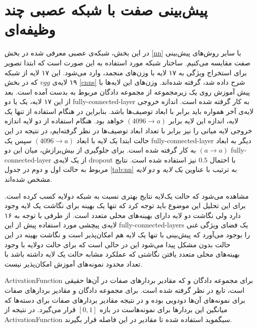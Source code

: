 \section{پیش‌بینی صفت با شبکه عصبی چند وظیفه‌ای} \label{exp:nn}

در این بخش، شبکه‌ی عصبی معرفی شده در بخش \ref{nn} با سایر روش‌های پیش‌بینی صفت مقایسه می‌کنیم.
ساختار شبکه مورد استفاده به این صورت است که ابتدا تصویر برای استخراج ویژگی به ۱۷ لایه با وزن‌های منجمد، وارد می‌شود. این ۱۷ لایه از شبکه ۱۹ لایه‌ی $vgg$ که در بخش
\ref{cnns}
شرح داده شد، گرفته شده‌اند. وزن‌های این لایه‌ها با پیش آموزش روی یک زیرمجموعه از مجموعه دادگان  مربوط به  بدست آمده است.
بعد از این ۱۷ لایه، یک یا دو \gls{fully-connected-layer} به کار گرفته شده است. اندازه خروجی لایه‌ی آخر همواره باید برابر با ابعاد توصیف‌ها باشد. بنابراین در هنگام استفاده از تنها یک لایه، اندازه این لایه برابر
$(4096 \rightarrow a)$
خواهد بود. هنگام استفاده از دو لایه اندازه خروجی لایه میانی را نیز برابر با تعداد ابعاد توصیف‌ها در نظر گرفته‌ایم، در نتیجه در این حالت ابتدا یک لایه با ابعاد
$(4096 \rightarrow a)$
سپس یک \gls{fully-connected-layer} دیگر به ابعاد
$(a \rightarrow a)$
به کار گرفته شده است.
برای جلوگیری از بیش‌برازش، میان این دو \gls{fully-connected-layer} از یک لایه‌ی
\gls{dropout} \cite{dropout}
 با احتمال $0.5$  نیز استفاده شده است.
 نتایج مربوط به حالت اول و دوم  در جدول \ref{tab:nn} به ترتیب با عناوین
\textit{ یک لایه}
و
\textit{ دو لایه}
مشخص شده‌اند.

مشاهده می‌شود که حالت یک‌لایه نتایج بهتری نسبت به شبکه دولایه کسب کرده است. برای این تحلیل این موضوع باید توجه کرد که تنها یک بهینه برای نگاشت یک لایه وجود دارد ولی نگاشت دو لایه دارای بهینه‌های محلی متعدد است. از طرفی
 با توجه به ۱۶ لایه‌ی پیچشی مورد استفاده پیش از این
\glspl{fully-connected-layer}
یک فضای ویژگی غنی را بوجود می‌آورد که پیش‌بینی با تنها یک لایه هم امکان‌پذیر است و نگاشت بهینه در این حالت بدون مشکل پیدا می‌شود این در حالی است که برای حالت دولایه با وجود بهینه‌های محلی متعدد یافتن نگاشتی که عملکرد مشابه حالت یک لایه داشته باشد با تعداد محدود نمونه‌های آموزش امکان‌پذیر نیست.


 \gls{ActivationFunction} برای مجموعه دادگان   و  که مقادیر بردارهای صفات در آن‌ها حقیقی است، تابع  در نظر گرفته شده است. برای مجموعه دادگان  و   مقادیر بردارهای صفات برای نمونه‌های آن‌ها دودویی بوده و در نتیجه مقادیر بردارهای صفات برای دسته‌ها که میانگین این بردارها برای نمونه‌هاست در بازه
$[0,1]$
قرار می‌گیرد. در نتیجه از \gls{ActivationFunction} سیگموید استفاده شده تا مقادیر در این فاصله قرار بگیرند.

